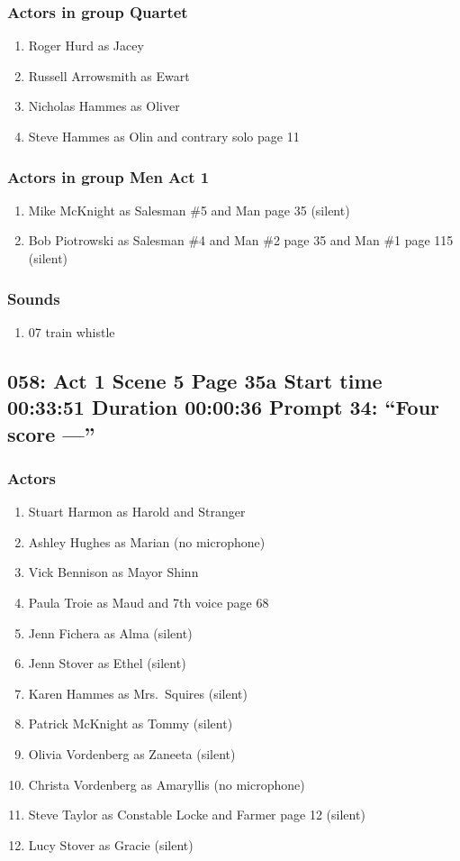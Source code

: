 \subsubsection{Actors in group Quartet}
\begin{enumerate}
\item Roger Hurd as Jacey
\item Russell Arrowsmith as Ewart
\item Nicholas Hammes as Oliver
\item Steve Hammes as Olin and contrary solo page 11
\end{enumerate}
\subsubsection{Actors in group Men Act 1}
\begin{enumerate}
\item Mike McKnight as Salesman \#5 and Man page 35 (silent)
\item Bob Piotrowski as Salesman \#4 and Man \#2 page 35 and Man \#1 page 115 (silent)
\end{enumerate}

\subsubsection{Sounds}
\begin{enumerate}
\item 07 train whistle
\end{enumerate}
\subsection{058: Act 1 Scene 5 Page 35a Start time 00:33:51 Duration 00:00:36 Prompt 34: ``Four score ---''}

\subsubsection{Actors}
\begin{enumerate}
\item Stuart Harmon as Harold and Stranger
\item Ashley Hughes as Marian (no microphone)
\item Vick Bennison as Mayor Shinn
\item Paula Troie as Maud and 7th voice page 68
\item Jenn Fichera as Alma (silent)
\item Jenn Stover as Ethel (silent)
\item Karen Hammes as Mrs.~Squires (silent)
\item Patrick McKnight as Tommy (silent)
\item Olivia Vordenberg as Zaneeta (silent)
\item Christa Vordenberg as Amaryllis (no microphone)
\item Steve Taylor as Constable Locke and Farmer page 12 (silent)
\item Lucy Stover as Gracie (silent)
\end{enumerate}
